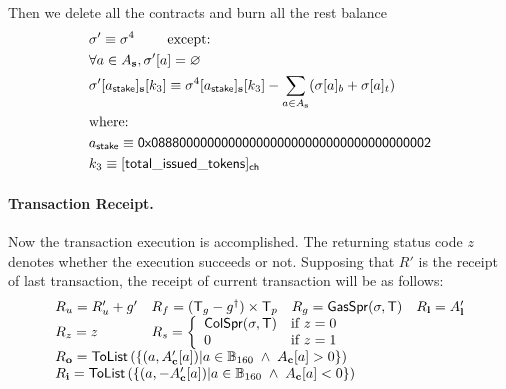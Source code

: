 Then we delete all the contracts and burn all the rest balance 
%
\begin{align}
	&\st' \eqdef \st^4 \qquad \mbox{  except:} \\ 
	&\forall a \in A_{\bf s}, \st'[a] = \varnothing \\ 
	&\st'[a_{\sf stake}]_{\bf s}[k_3] \eqdef \st^4[a_{\sf stake}]_{\bf s}[k_3] - \sum_{a\in A_{\bf s}} (\st[a]_b + \st[a]_t) \\
	&\mbox{where:}  \\
	&a_{\sf stake} \eqdef \stakingcontract \\ 
	&k_3 \eqdef {\sf [total\char`_issued\char`_tokens]_{\sf ch}}  
\end{align}

\paragraph{Transaction Receipt.} 

Now the transaction execution is accomplished.
The returning status code $z$ denotes whether the execution succeeds or not. 
Supposing that $R'$ is the receipt of last transaction, 
the receipt of current transaction will be as follows:
\begin{align}
	\begin{array}{llll}
		R_u=R'_u+g' & R_f = (\tx_g-g^{\dagger})\times \tx_p & R_g = \mathsf{GasSpr}(\st,\tx) & R_{\bf l}=A'_{\bf l} \\ 
		R_z=z & \multicolumn{3}{l}{R_s = \left\{\begin{array}{ll}
			\mathsf{ColSpr}(\st,\tx) & \text{if }z=0\\
			0 & \text{if }z=1
		\end{array}\right.} \\
		\multicolumn{4}{l}{R_{\bf o}=\mathsf{ToList}\left(\left\{ (a,A'_{\bf c}[a]) | a\in \B_{160}\;\wedge\; A_{\bf c}[a]>0 \right\}\right)}\\
		\multicolumn{4}{l}{R_{\bf i}=\mathsf{ToList}\left(\left\{(a,-A'_{\bf c}[a]) | a\in \B_{160}\;\wedge\; A_{\bf c}[a]<0  \right\}\right)}
	\end{array}
\end{align}
